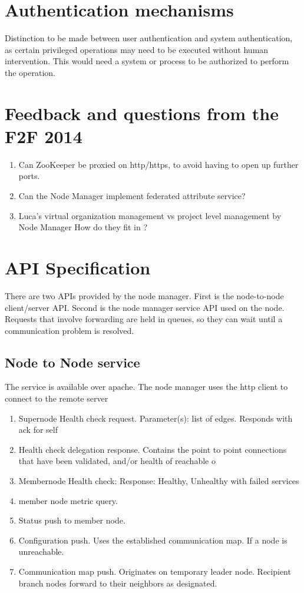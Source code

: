 \documentclass[oneside,12pt]{memoir}
\def\nm{Node Manager{ }}
\begin{document}
\section{Authentication mechanisms}
Distinction to be made between user authentication and system authentication, as certain privileged operations may need to be executed without human intervention. This would need a system or process to be authorized to perform the operation. 

\section{Feedback and questions from the F2F 2014}
\begin{enumerate}
\item Can ZooKeeper be proxied on http/https, to avoid having to open up further ports.
\item Can the \nm implement federated attribute service?
\item Luca's virtual organization management vs project level management by \nm How do they fit in ?
\end{enumerate}

\section{API Specification}

There are two APIs provided by the node manager.  First is the node-to-node client/server API.  Second is the node manager service API used on the node.  Requests that involve forwarding are held in queues, so they can wait until a communication problem is resolved. 

\subsection{Node to Node service}

The service is available over apache. The node manager uses the http client to connect to the remote server

\begin{enumerate}
\item
Supernode Health check request.  Parameter(s): list of edges.  Responds with ack for self

\item
Health check delegation response.  Contains the point to point connections that have been validated, and/or health of reachable o

\item
Membernode Health check:  Response: Healthy, Unhealthy with failed services
\item
member node metric query.
\item
Status push to member node.
\item
Configuration push.  Uses the established communication map.  If a node is unreachable.
\item
Communication map push.  Originates on temporary leader node.  Recipient branch nodes forward to their neighbors as designated.

\end{enumerate}
\end{document}
